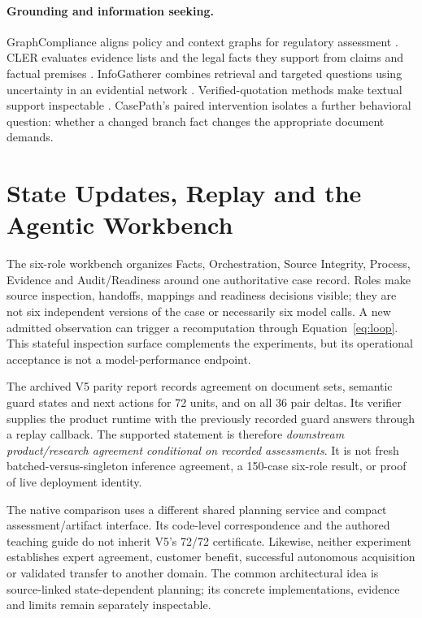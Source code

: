\paragraph{Grounding and information seeking.}
GraphCompliance aligns policy and context graphs for regulatory assessment
\citep{chung2025graphcompliance}. CLER evaluates evidence lists and the legal
facts they support from claims and factual premises \citep{bi2026cler}.
InfoGatherer combines retrieval and targeted questions using uncertainty
in an evidential network \citep{taranukhin2026infogatherer}. Verified-quotation
methods make textual support inspectable \citep{menick2022verifiedquotes}.
CasePath's paired intervention isolates a further behavioral question:
whether a changed branch fact changes the appropriate document demands.

\section{State Updates, Replay and the Agentic Workbench}
\label{sec:product}

The six-role workbench organizes Facts, Orchestration, Source Integrity,
Process, Evidence and Audit/Readiness around one authoritative case record.
Roles make source inspection, handoffs, mappings and readiness decisions
visible; they are not six independent versions of the case or necessarily
six model calls. A new admitted observation can trigger a recomputation
through Equation~\eqref{eq:loop}. This stateful inspection surface complements
the experiments, but its operational acceptance is not a model-performance
endpoint.

The archived V5 parity report records agreement on document sets, semantic
guard states and next actions for 72 units, and on all 36 pair deltas. Its
verifier supplies the product runtime with the previously recorded guard
answers through a replay callback. The supported statement is therefore
\emph{downstream product/research agreement conditional on recorded
assessments}. It is not fresh batched-versus-singleton inference agreement,
a 150-case six-role result, or proof of live deployment identity.

The native comparison uses a different shared planning service and compact
assessment/artifact interface. Its code-level correspondence and the
authored teaching guide do not inherit V5's 72/72 certificate. Likewise,
neither experiment establishes expert agreement, customer benefit, successful
autonomous acquisition or validated transfer to another domain. The common
architectural idea is source-linked state-dependent planning; its concrete
implementations, evidence and limits remain separately inspectable.
